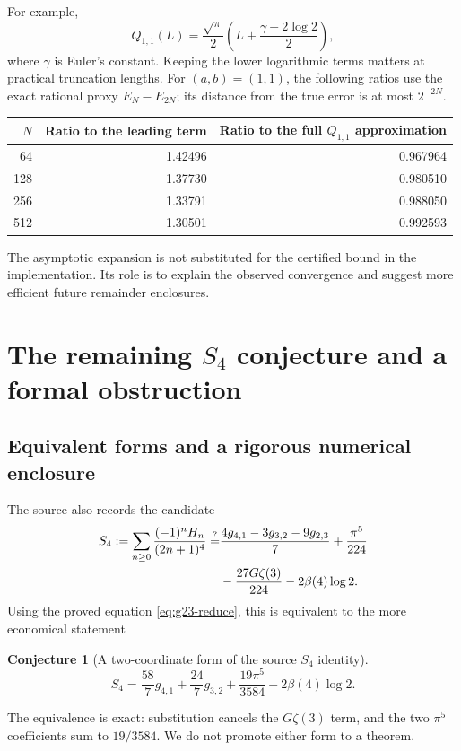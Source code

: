 \documentclass[11pt,a4paper]{article}
\numberwithin{equation}{section}
\theoremstyle{definition}
\newtheorem{conjecture}[theorem]{Conjecture}
\theoremstyle{remark}
\begin{document}
For example,
\begin{equation}\label{eq:Q11}
 Q_{1,1}(L)=\frac{\sqrt\pi}{2}
       \left(L+\frac{\gamma+2\log2}{2}\right),
\end{equation}
where $\gamma$ is Euler's constant. Keeping the lower logarithmic terms matters at practical truncation lengths. For $(a,b)=(1,1)$, the following ratios use the exact rational proxy $E_N-E_{2N}$; its distance from the true error is at most $2^{-2N}$.
\begin{center}
\begin{tabular}{@{}rrr@{}}
\toprule
$N$ & Ratio to the leading term & Ratio to the full $Q_{1,1}$ approximation\\
\midrule
64 &1.42496&0.967964\\
128&1.37730&0.980510\\
256&1.33791&0.988050\\
512&1.30501&0.992593\\
\bottomrule
\end{tabular}
\end{center}
The asymptotic expansion is not substituted for the certified bound in the implementation. Its role is to explain the observed convergence and suggest more efficient future remainder enclosures.

\section{The remaining \texorpdfstring{$S_4$}{S4} conjecture and a formal obstruction}
\label{sec:S4}

\subsection{Equivalent forms and a rigorous numerical enclosure}
The source also records the candidate
\begin{align}\label{eq:S4-source}
 S_4:=\sum_{n\ge0}\frac{(-1)^nH_n}{(2n+1)^4}
 \stackrel{?}{=}&\frac{4g_{4,1}-3g_{3,2}-9g_{2,3}}7
 +\frac{\pi^5}{224}\notag\\
 &-\frac{27G\zeta(3)}{224}-2\beta(4)\log2.
\end{align}
Using the proved equation \eqref{eq:g23-reduce}, this is equivalent to the more economical statement
\begin{conjecture}[A two-coordinate form of the source $S_4$ identity]\label{conj:S4}
\begin{equation}\label{eq:S4-simple}
 S_4=\frac{58}{7}g_{4,1}+\frac{24}{7}g_{3,2}
       +\frac{19\pi^5}{3584}-2\beta(4)\log2.
\end{equation}
\end{conjecture}
The equivalence is exact: substitution cancels the $G\zeta(3)$ term, and the two $\pi^5$ coefficients sum to $19/3584$. We do not promote either form to a theorem.
\end{document}
